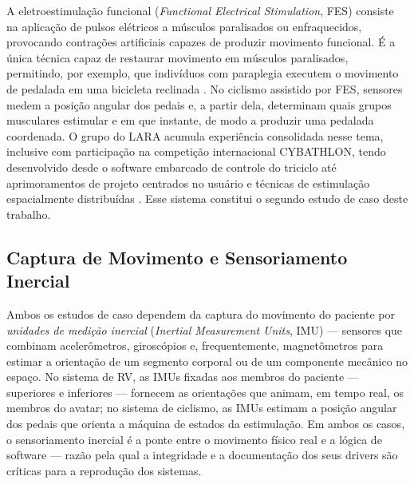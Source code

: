 A eletroestimulação funcional (\emph{Functional Electrical Stimulation}, FES) consiste na
aplicação de pulsos elétricos a músculos paralisados ou enfraquecidos, provocando
contrações artificiais capazes de produzir movimento funcional. É a única técnica capaz de
restaurar movimento em músculos paralisados, permitindo, por exemplo, que indivíduos com
paraplegia executem o movimento de pedalada em uma bicicleta reclinada \cite{baptista2022}.
No ciclismo assistido por FES, sensores medem a posição angular dos pedais e, a partir
dela, determinam quais grupos musculares estimular e em que instante, de modo a produzir
uma pedalada coordenada. O grupo do LARA acumula experiência consolidada nesse tema,
inclusive com participação na competição internacional CYBATHLON, tendo desenvolvido desde
o software embarcado de controle do triciclo \cite{brindeiro2017} até aprimoramentos de
projeto centrados no usuário e técnicas de estimulação espacialmente distribuídas
\cite{baptista2022}. Esse sistema constitui o segundo estudo de caso deste trabalho.

\subsection{Captura de Movimento e Sensoriamento Inercial}
\label{sec:imu}

Ambos os estudos de caso dependem da captura do movimento do paciente por
\emph{unidades de medição inercial} (\emph{Inertial Measurement Units}, IMU) --- sensores
que combinam acelerômetros, giroscópios e, frequentemente, magnetômetros para estimar a
orientação de um segmento corporal ou de um componente mecânico no espaço. No sistema de
RV, as IMUs fixadas aos membros do paciente --- superiores e inferiores --- fornecem as
orientações que animam, em tempo real, os membros do avatar; no sistema de ciclismo, as IMUs
estimam a posição angular dos pedais que orienta a máquina de estados da estimulação. Em
ambos os casos, o
sensoriamento inercial é a ponte entre o movimento físico real e a lógica de software ---
razão pela qual a integridade e a documentação dos seus drivers são críticas para a
reprodução dos sistemas.
